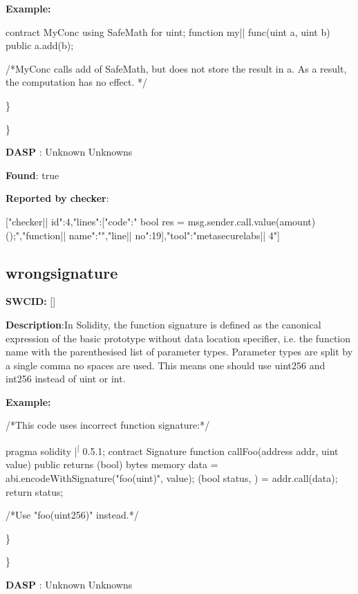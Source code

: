 \documentclass{article}
\begin{document}
\textbf{Example:} 
\begin{ffcode} 

contract MyConc{
    using SafeMath for uint;
    function my|\textunderscore| func(uint a, uint b) public{
        a.add(b);
    }
}

 /*MyConc calls add of SafeMath, but does not store the result in a. As a result, the computation has no effect. */ 

\end{ffcode} 
\} 

\} 

\textbf{DASP} : Unknown Unknowns

\textbf{Found}: true

\textbf{Reported by checker}: 
\begin{ffcode} 

[{"checker|\textunderscore| id":4,"lines":[{"code":"      bool res = msg.sender.call.value(amount)();\n","function|\textunderscore| name":"","line|\textunderscore| no":19}],"tool":"metasecurelabs|\textendash| 4"}]
\end{ffcode} 
\subsection{wrong{\textunderscore}signature} 
\textbf{SWC{\textunderscore}ID:} []

\textbf{Description}:In Solidity, the function signature is defined as the canonical expression of the basic prototype without data location specifier, i.e. the function name with the parenthesised list of parameter types. Parameter types are split by a single comma {\textendash} no spaces are used. This means one should use uint256 and int256 instead of uint or int.


\textbf{Example:} 
\begin{ffcode} 

 /*This code uses incorrect function signature:*/ 

pragma solidity |\textsuperscript| 0.5.1;
contract Signature {
    function callFoo(address addr, uint value) public returns (bool) {
        bytes memory data = abi.encodeWithSignature("foo(uint)", value);
        (bool status, ) = addr.call(data);
        return status;
    }
}

/*Use "foo(uint256)" instead.*/

\end{ffcode} 
\} 

\} 

\textbf{DASP} : Unknown Unknowns
\end{document}
